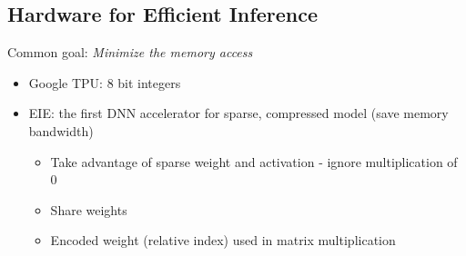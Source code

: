 \subsection{Hardware for Efficient Inference}
Common goal: \textit{Minimize the memory access}
\begin{itemize}
	\item Google TPU: 8 bit integers
	\item EIE: the first DNN accelerator for sparse, compressed model (save memory bandwidth)
	\begin{itemize}
		\item Take advantage of sparse weight and activation - ignore multiplication of 0
		\item Share weights
		\item Encoded weight (relative index) used in matrix multiplication
	\end{itemize}
\end{itemize}


